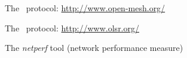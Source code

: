 \documentclass{article}
\begin{document}
\begin{thebibliography}{99}

     The \batman\ protocol:
    \url{http://www.open-mesh.org/}

     The \olsr\ protocol:
    \url{http://www.olsr.org/}

     The \emph{netperf} tool (network performance
    measure)

%
%

\end{thebibliography}
\end{document}
